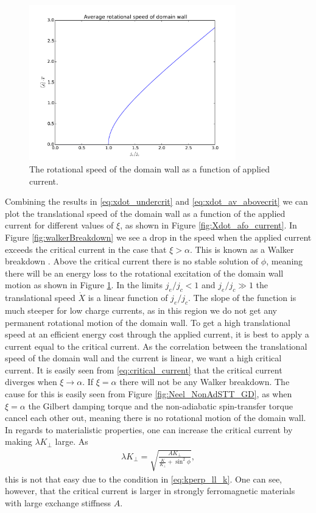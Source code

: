 \documentclass[12pt, a4paper, twoside, openright]{article}		%
\numberwithin{equation}{section}
\begin{document}
\begin{figure}[h!]
\begin{center}
\includegraphics[width=0.8\textwidth]{Figures/criticalCurrentPhidot.pdf} 
\caption{The rotational speed of the domain wall as a function of applied current.}
\label{fig:phidot_afo_current} 
\end{center}
\end{figure}
Combining the results in \eqref{eq:xdot_undercrit} and \eqref{eq:xdot_av_abovecrit} we can plot the translational speed of the domain wall as a function of the applied current for different values of $\xi$, as shown in Figure \ref{fig:Xdot_afo_current}. In Figure \ref{fig:walkerBreakdown} we see a drop in the speed when the applied current exceeds the critical current in the case that $\xi > \alpha$. This is known as a Walker breakdown \cite{SchryerWalker1974}. Above the critical current there is no stable solution of $\phi$, meaning there will be an energy loss to the rotational excitation of the domain wall motion as shown in Figure \ref{fig:phidot_afo_current}. In the limits $j_e/j_c < 1$ and $j_e/j_c \gg 1$ the translational speed $\dot{X}$ is a linear function of $j_e/j_c$. The slope of the function is much steeper for low charge currents, as in this region we do not get any permanent rotational motion of the domain wall. To get a high translational speed at an efficient energy cost through the applied current, it is best to apply a current equal to the critical current. As the correlation between the translational speed of the domain wall and the current is linear, we want a high critical current. It is easily seen from \eqref{eq:critical_current} that the critical current diverges when $\xi \rightarrow \alpha$. If $\xi=\alpha$ there will not be any Walker breakdown. The cause for this is easily seen from Figure \ref{fig:Neel_NonAdSTT_GD}, as when $\xi=\alpha$ the Gilbert damping torque and the non-adiabatic spin-transfer torque cancel each other out, meaning there is no rotational motion of the domain wall. In regards to materialistic properties, one can increase the critical current by making $\lambda K_{\perp}$ large. As 
\begin{align}
\lambda K_{\perp} = \sqrt{\frac{AK_{\perp}}{\frac{K}{K_{\perp}}+\sin^2\phi}},
\end{align}
this is not that easy due to the condition in \eqref{eq:kperp_ll_k}. One can see, however, that the critical current is larger in strongly ferromagnetic materials with large exchange stiffness $A$.
\end{document}
